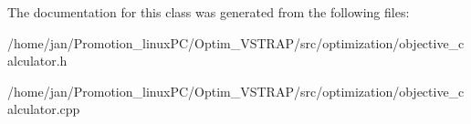 The documentation for this class was generated from the following files\+:\begin{DoxyCompactItemize}
\item 
/home/jan/\+Promotion\+\_\+linux\+P\+C/\+Optim\+\_\+\+V\+S\+T\+R\+A\+P/src/optimization/objective\+\_\+calculator.\+h\item 
/home/jan/\+Promotion\+\_\+linux\+P\+C/\+Optim\+\_\+\+V\+S\+T\+R\+A\+P/src/optimization/objective\+\_\+calculator.\+cpp\end{DoxyCompactItemize}
